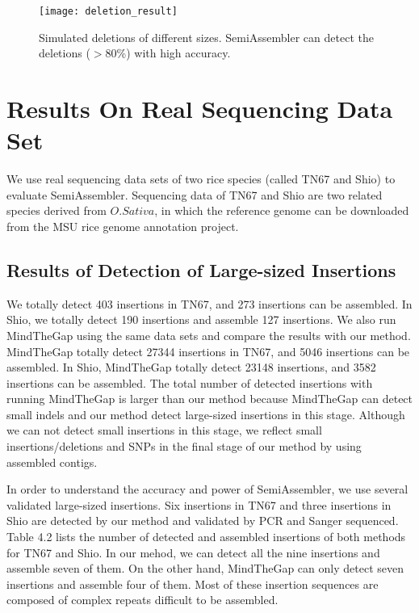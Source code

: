 \begin{figure}[ht]
\begin{center}
\texttt{[image: deletion\_result]}
\caption{Simulated deletions of different sizes. SemiAssembler can detect the deletions ($>80$\%) with high accuracy.}
\label{}
\end{center}
\end{figure}




\clearpage


\section{Results On Real Sequencing Data Set}
We use real sequencing data sets of two rice species (called TN67 and Shio) to evaluate SemiAssembler. Sequencing data of TN67 and Shio are two related species derived from $O. Sativa$, in which the reference genome can be downloaded from the MSU rice genome annotation project. 

\subsection{Results of Detection of Large-sized Insertions}
We totally detect 403 insertions in TN67, and 273 insertions can be assembled. In Shio, we totally detect 190 insertions and assemble 127 insertions. We also run MindTheGap using the same data sets and compare the results with our method. MindTheGap totally detect 27344 insertions in TN67, and 5046 insertions can be assembled. In Shio, MindTheGap totally detect 23148 insertions, and 3582 insertions can be assembled. The total number of detected insertions with running MindTheGap is larger than our method because MindTheGap can detect small indels and our method detect large-sized insertions in this stage. Although we can not detect small insertions in this stage, we reflect small insertions/deletions and SNPs in the final stage of our method by using assembled contigs. 

In order to understand the accuracy and power of SemiAssembler, we use several validated large-sized insertions. Six insertions in TN67 and three insertions in Shio are detected by our method and validated by PCR and Sanger sequenced. Table 4.2 lists the number of detected and assembled insertions of both methods for TN67 and Shio.  In our mehod, we can detect all the nine insertions and assemble seven of them. On the other hand, MindTheGap can only detect seven insertions and assemble four of them. Most of these insertion sequences are composed of complex repeats difficult to be assembled. 



